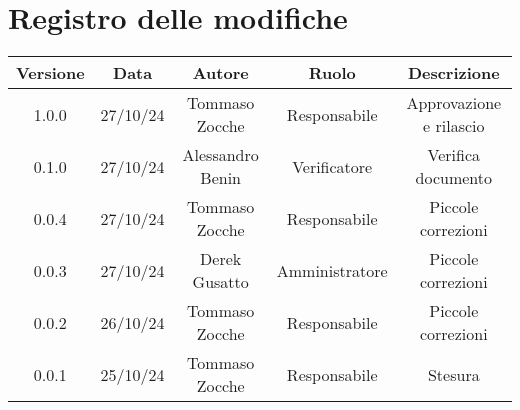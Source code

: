 
\section*{Registro delle modifiche}
\begin{table}[H]
    \begin{tabular}{|c|c|c|c|c|}
        \hline
         \textbf{Versione} &  \textbf{Data} &  \textbf{Autore} &  \textbf{Ruolo} & \textbf{Descrizione} \\
          \hline
          1.0.0 & 27/10/24 & Tommaso Zocche & Responsabile & Approvazione e rilascio\\
          \hline
           0.1.0 & 27/10/24 & Alessandro Benin & Verificatore &   Verifica documento\\
          \hline
          0.0.4 & 27/10/24 & Tommaso Zocche & Responsabile & Piccole correzioni \\
          \hline
          0.0.3 & 27/10/24 & Derek Gusatto & Amministratore & Piccole correzioni \\
          \hline
          0.0.2 & 26/10/24 & Tommaso Zocche & Responsabile & Piccole correzioni \\
          \hline
          0.0.1 & 25/10/24 & Tommaso Zocche & Responsabile & Stesura \\
          \hline
    \end{tabular}
\end{table}